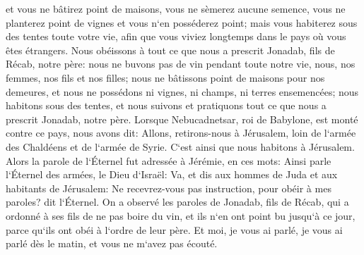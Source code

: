 \verse et vous ne bâtirez point de maisons, vous ne sèmerez aucune semence, vous ne planterez point de vignes et vous n`en posséderez point; mais vous habiterez sous des tentes toute votre vie, afin que vous viviez longtemps dans le pays où vous êtes étrangers. 
\verse Nous obéissons à tout ce que nous a prescrit Jonadab, fils de Récab, notre père: nous ne buvons pas de vin pendant toute notre vie, nous, nos femmes, nos fils et nos filles; 
\verse nous ne bâtissons point de maisons pour nos demeures, et nous ne possédons ni vignes, ni champs, ni terres ensemencées; 
\verse nous habitons sous des tentes, et nous suivons et pratiquons tout ce que nous a prescrit Jonadab, notre père. 
\verse Lorsque Nebucadnetsar, roi de Babylone, est monté contre ce pays, nous avons dit: Allons, retirons-nous à Jérusalem, loin de l`armée des Chaldéens et de l`armée de Syrie. C`est ainsi que nous habitons à Jérusalem. 
\verse Alors la parole de l`Éternel fut adressée à Jérémie, en ces mots: 
\verse Ainsi parle l`Éternel des armées, le Dieu d`Israël: Va, et dis aux hommes de Juda et aux habitants de Jérusalem: Ne recevrez-vous pas instruction, pour obéir à mes paroles? dit l`Éternel. 
\verse On a observé les paroles de Jonadab, fils de Récab, qui a ordonné à ses fils de ne pas boire du vin, et ils n`en ont point bu jusqu`à ce jour, parce qu`ils ont obéi à l`ordre de leur père. Et moi, je vous ai parlé, je vous ai parlé dès le matin, et vous ne m`avez pas écouté. 
